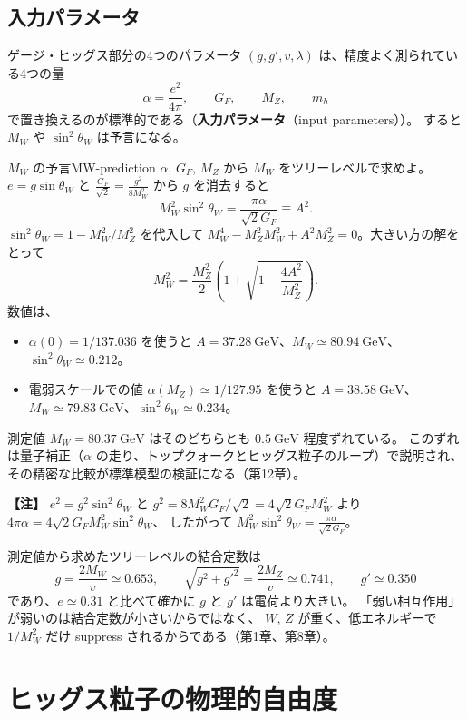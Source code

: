 \documentclass[uplatex,dvipdfmx,a4paper,11pt,openany]{jsbook}
\newcommand{\term}[2]{\textbf{#1}（#2）}
\newenvironment{note}{\vspace{1ex}\par\footnotesize\noindent\textbf{【注】}}{\par\vspace{1ex}}
\numberwithin{equation}{chapter}
\theoremstyle{definition}
\theoremstyle{plain}
\theoremstyle{remark}
\begin{document}
\subsection{入力パラメータ}
ゲージ・ヒッグス部分の4つのパラメータ $(g,g',v,\lambda)$ は、精度よく測られている4つの量
\begin{equation}
\alpha=\frac{e^2}{4\pi},\qquad G_F,\qquad M_Z,\qquad m_h
\end{equation}
で置き換えるのが標準的である（\term{入力パラメータ}{input parameters}）。
すると $M_W$ や $\sin^2\theta_W$ は予言になる。
\begin{myex}{$M_W$ の予言}{MW-prediction}
$\alpha$, $G_F$, $M_Z$ から $M_W$ をツリーレベルで求めよ。
\tcblower
$e=g\sin\theta_W$ と $\frac{G_F}{\sqrt2}=\frac{g^2}{8M_W^2}$ から $g$ を消去すると
\[
M_W^2\sin^2\theta_W=\frac{\pi\alpha}{\sqrt2G_F}\equiv A^2 .
\]
$\sin^2\theta_W=1-M_W^2/M_Z^2$ を代入して $M_W^4-M_Z^2M_W^2+A^2M_Z^2=0$。大きい方の解をとって
\[
M_W^2=\frac{M_Z^2}{2}\left(1+\sqrt{1-\frac{4A^2}{M_Z^2}}\right).
\]
数値は、
\begin{itemize}
    \item $\alpha(0)=1/137.036$ を使うと $A=37.28\ \mathrm{GeV}$、$M_W\simeq80.94\ \mathrm{GeV}$、$\sin^2\theta_W\simeq0.212$。
    \item 電弱スケールでの値 $\alpha(M_Z)\simeq1/127.95$ を使うと $A=38.58\ \mathrm{GeV}$、$M_W\simeq79.83\ \mathrm{GeV}$、$\sin^2\theta_W\simeq0.234$。
\end{itemize}
測定値 $M_W=80.37\ \mathrm{GeV}$ はそのどちらとも $0.5\ \mathrm{GeV}$ 程度ずれている。
このずれは量子補正（$\alpha$ の走り、トップクォークとヒッグス粒子のループ）で説明され、
その精密な比較が標準模型の検証になる（第12章）。
\end{myex}
\begin{note}
$e^2=g^2\sin^2\theta_W$ と $g^2=8M_W^2G_F/\sqrt2=4\sqrt2G_FM_W^2$ より $4\pi\alpha=4\sqrt2G_FM_W^2\sin^2\theta_W$、
したがって $M_W^2\sin^2\theta_W=\frac{\pi\alpha}{\sqrt2G_F}$。
\end{note}
測定値から求めたツリーレベルの結合定数は
\begin{equation}
g=\frac{2M_W}{v}\simeq0.653,\qquad
\sqrt{g^2+g'^2}=\frac{2M_Z}{v}\simeq0.741,\qquad
g'\simeq0.350
\end{equation}
であり、$e\simeq0.31$ と比べて確かに $g$ と $g'$ は電荷より大きい。
「弱い相互作用」が弱いのは結合定数が小さいからではなく、
$W$, $Z$ が重く、低エネルギーで $1/M_W^2$ だけ suppress されるからである（第1章、第8章）。
\section{ヒッグス粒子の物理的自由度}
\label{sec:higgs-dof}
\end{document}
